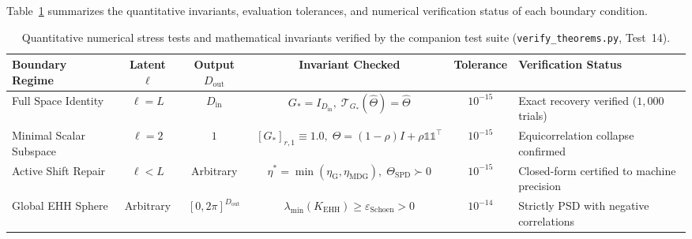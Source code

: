 \documentclass[default,sn-mathphys,Numbered]{sn-jnl}
\theoremstyle{thmstyleone}
\theoremstyle{thmstylethree}
\theoremstyle{thmstyletwo}
\newcommand{\inp}{\text{in}}
\newcommand{\outp}{\text{out}}
\begin{document}
\begin{appendices}
Table~\ref{tab:boundary_invariants} summarizes the quantitative invariants, evaluation tolerances, and numerical verification status of each boundary condition.

\begin{table}[htbp]
\caption{Quantitative numerical stress tests and mathematical invariants verified by the companion test suite (\texttt{verify\_theorems.py}, Test~14).}
\label{tab:boundary_invariants}
\small
\begin{tabularx}{\textwidth}{lccccX}
\toprule
\textbf{Boundary Regime} & \textbf{Latent $\ell$} & \textbf{Output $D_{\outp}$} & \textbf{Invariant Checked} & \textbf{Tolerance} & \textbf{Verification Status} \\
\midrule
Full Space Identity & $\ell = L$ & $D_{\inp}$ & $G_* = I_{D_{\inp}},\;\mathcal{T}_{G_*}(\hat{\Theta}) = \hat{\Theta}$ & $10^{-15}$ & Exact recovery verified ($1{,}000$ trials) \\
Minimal Scalar Subspace & $\ell = 2$ & $1$ & $[G_*]_{r, 1} \equiv 1.0,\;\Theta = (1-\rho)I + \rho \mathds{1}\mathds{1}^\top$ & $10^{-15}$ & Equicorrelation collapse confirmed \\
Active Shift Repair & $\ell < L$ & Arbitrary & $\eta^* = \min(\eta_{\mathrm{G}}, \eta_{\mathrm{MDG}}),\;\Theta_{\mathrm{SPD}} \succ 0$ & $10^{-15}$ & Closed-form certified to machine precision \\
Global EHH Sphere & Arbitrary & $[0, 2\pi]^{D_{\outp}}$ & $\lambda_{\min}(K_{\mathrm{EHH}}) \ge \varepsilon_{\mathrm{Schoen}} > 0$ & $10^{-14}$ & Strictly PSD with negative correlations \\
\bottomrule
\end{tabularx}
\end{table}


\end{appendices}
\end{document}
